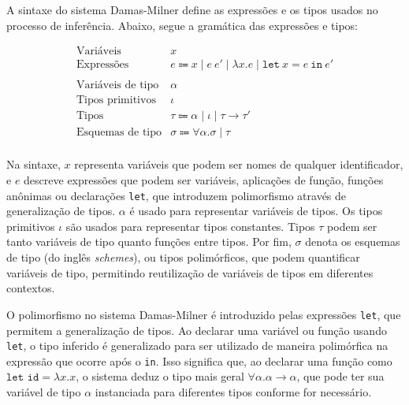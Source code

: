 A sintaxe do sistema Damas-Milner define as expressões e os tipos usados no processo de inferência.
Abaixo, segue a gramática das expressões e tipos:

\begin{equation}\label{eq:dm-syntax}\nonumber
  \begin{array}{ll}
    \text{Variáveis}         & x                                                                                 \\
    \text{Expressões}        & e \Coloneqq x \mid e \ e' \mid \lambda x.e \mid \texttt{let} \ x = e \ \texttt{in} \ e' \\
    \\
    \text{Variáveis de tipo} & \alpha                                                                            \\
    \text{Tipos primitivos}  & \iota                                                                             \\
    \text{Tipos}             & \tau \Coloneqq \alpha \mid \iota \mid \tau \rightarrow \tau'                       \\
    \text{Esquemas de tipo}           & \sigma \Coloneqq \forall \alpha. \sigma \mid \tau                        \\
  \end{array}
\end{equation}

Na sintaxe, $x$ representa variáveis que podem ser nomes de qualquer identificador, e $e$ descreve expressões que podem ser variáveis, aplicações de função, funções anônimas ou declarações \texttt{let}, que introduzem polimorfismo através de generalização de tipos.
$\alpha$ é usado para representar variáveis de tipos.
Os tipos primitivos $\iota$ são usados para representar tipos constantes.
Tipos $\tau$ podem ser tanto variáveis de tipo quanto funções entre tipos.
Por fim, $\sigma$ denota os esquemas de tipo (do inglês \textit{schemes}), ou tipos polimórficos, que podem quantificar variáveis de tipo, permitindo reutilização de variáveis de tipos em diferentes contextos.

O polimorfismo no sistema Damas-Milner é introduzido pelas expressões \texttt{let}, que permitem a generalização de tipos.
Ao declarar uma variável ou função usando \texttt{let}, o tipo inferido é generalizado para ser utilizado de maneira polimórfica na expressão que ocorre após o \texttt{in}.
Isso significa que, ao declarar uma função como $\texttt{let id} = \lambda x.x$, o sistema deduz o tipo mais geral $\forall \alpha. \alpha \rightarrow \alpha$, que pode ter sua variável de tipo $\alpha$ instanciada para diferentes tipos conforme for necessário.

